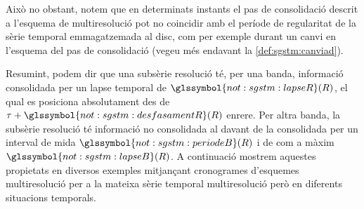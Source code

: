 Això no obstant, notem que en determinats instants el pas de
consolidació descrit a l'esquema de multiresolució pot no coincidir
amb el període de regularitat de la sèrie temporal emmagatzemada al
disc, com per exemple durant un canvi en l'esquema del pas de
consolidació (vegeu més endavant
la \autoref{def:sgstm:canviad}). 


Resumint, podem dir que una subsèrie resolució té, per una banda,
informació consolidada per un lapse temporal de
$\glssymbol{not:sgstm:lapseR}(R)$, el qual es posiciona absolutament
des de $\tau + \glssymbol{not:sgstm:desfasamentR}(R)$ enrere. Per
altra banda, la subsèrie resolució té informació no consolidada al
davant de la consolidada per un interval de mida
$\glssymbol{not:sgstm:periodeB}(R)$ i de com a màxim
$\glssymbol{not:sgstm:lapseB}(R)$. A continuació mostrem aquestes
propietats en diversos exemples mitjançant cronogrames d'esquemes
multiresolució per a la mateixa sèrie temporal multiresolució però en
diferents situacions temporals.



